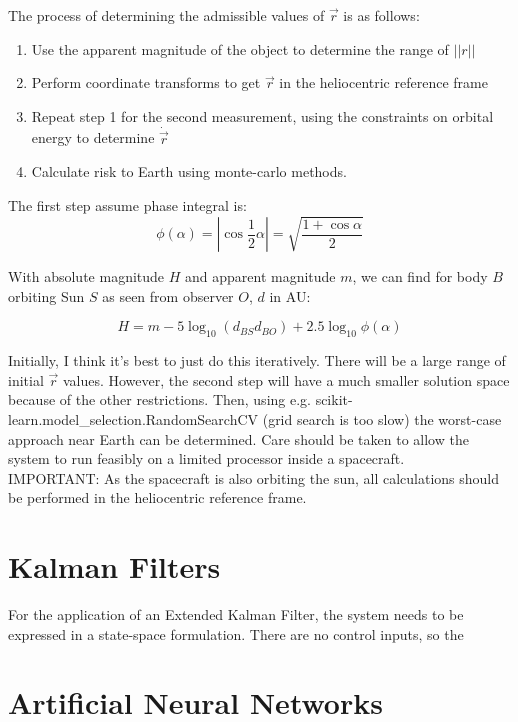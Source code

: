 \documentclass[a4paper,10pt]{article}
\begin{document}
The process of determining the admissible values of $\vec{r}$ is as follows:
\begin{enumerate}
 \item Use the apparent magnitude of the object to determine the range of $||r||$
 \item Perform coordinate transforms to get $\vec{r}$ in the heliocentric reference frame
 \item Repeat step 1 for the second measurement, using the constraints on orbital energy to determine $\dot{\vec{r}}$
 \item Calculate risk to Earth using monte-carlo methods.
\end{enumerate}

The first step assume phase integral is:
\begin{equation}
 \phi(\alpha) = |\cos{\frac{1}{2}\alpha}| = \sqrt{\frac{1+\cos \alpha}{2}}
 \label{eq:phase}
\end{equation}


With absolute magnitude $H$ and apparent magnitude $m$, we can find for body $B$ orbiting Sun $S$ as seen from observer $O$, $d$ in AU:

\begin{equation}
 H = m - 5 \log _{10} \left(d_{BS}d_{BO}\right) + 2.5\log _{10} \phi(\alpha)
\end{equation}

Initially, I think it's best to just do this iteratively. There will be a large range of initial $\vec{r}$ values. However, the second step will have a much smaller solution space because of the other restrictions. Then, using e.g. scikit-learn.model\_selection.RandomSearchCV (grid search is too slow) the worst-case approach near Earth can be determined. Care should be taken to allow the system to run feasibly on a limited processor inside a spacecraft.\\

IMPORTANT: As the spacecraft is also orbiting the sun, all calculations should be performed in the heliocentric reference frame.

\section{Kalman Filters}

For the application of an Extended Kalman Filter, the system needs to be expressed in a state-space formulation. There are no control inputs, so the

\section{Artificial Neural Networks}
\end{document}
